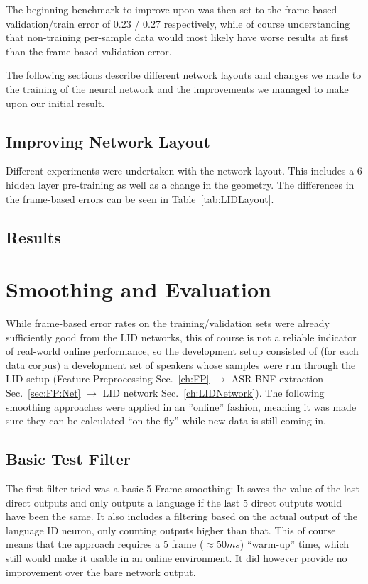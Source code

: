 The beginning benchmark to improve upon was then set to the frame-based validation/train error of 0.23 / 0.27 respectively, while of course understanding that non-training per-sample data would most likely have worse results at first than the frame-based validation error.

The following sections describe different network layouts and changes we made to the training of the neural network and the improvements we managed to make upon our initial result.

\section{Improving Network Layout}
\label{sec:LIDNetwork:Layout}

Different experiments were undertaken with the network layout. This includes a 6 hidden layer pre-training as well as a change in the geometry. The differences in the frame-based errors can be seen in Table~\ref{tab:LIDLayout}. 

\section{Results}
\label{sec:LIDNetwork:Results}


\chapter{Smoothing and Evaluation}
\label{ch:eval}

While frame-based error rates on the training/validation sets were already sufficiently good from the LID networks, this of course is not a reliable indicator of real-world online performance, so the development setup consisted of (for each data corpus) a development set of speakers whose samples were run through the LID setup (Feature Preprocessing Sec.~\ref{ch:FP} $\rightarrow$ ASR BNF extraction Sec.~\ref{sec:FP:Net} $\rightarrow$ LID network Sec.~\ref{ch:LIDNetwork}). The following smoothing approaches were applied in an ''online'' fashion, meaning it was made sure they can be calculated ``on-the-fly'' while new data is still coming in.

\section{Basic Test Filter}
\label{sec:eval:basic}

The first filter tried was a basic 5-Frame smoothing: It saves the value of the last direct outputs and only outputs a language if the last 5 direct outputs would have been the same. It also includes a filtering based on the actual output of the language ID neuron, only counting outputs higher than that. This of course means that the approach requires a 5 frame (\(\approx 50 ms\)) ``warm-up'' time, which still would make it usable in an online environment. It did however provide no improvement over the bare network output.


